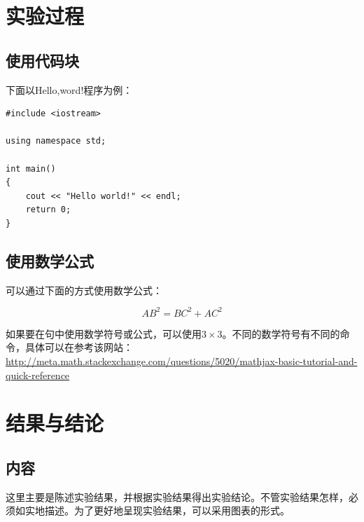 \documentclass[hyperref,UTF8]{ctexart}
\begin{document}

\section{实验过程}

\subsection{使用代码块}

下面以Hello,word!程序为例：

\begin{lstlisting}
#include <iostream>

using namespace std;

int main()
{
    cout << "Hello world!" << endl;
    return 0;
}
\end{lstlisting}

\subsection{使用数学公式}

可以通过下面的方式使用数学公式：

\begin{equation}
AB^2 = BC^2 + AC^2
\end{equation}

如果要在句中使用数学符号或公式，可以使用$3 \times 3$。不同的数学符号有不同的命令，具体可以在参考该网站：\url{http://meta.math.stackexchange.com/questions/5020/mathjax-basic-tutorial-and-quick-reference}

\section{结果与结论}

\subsection{内容}

这里主要是陈述实验结果，并根据实验结果得出实验结论。不管实验结果怎样，必须如实地描述。为了更好地呈现实验结果，可以采用图表的形式。
\end{document}
